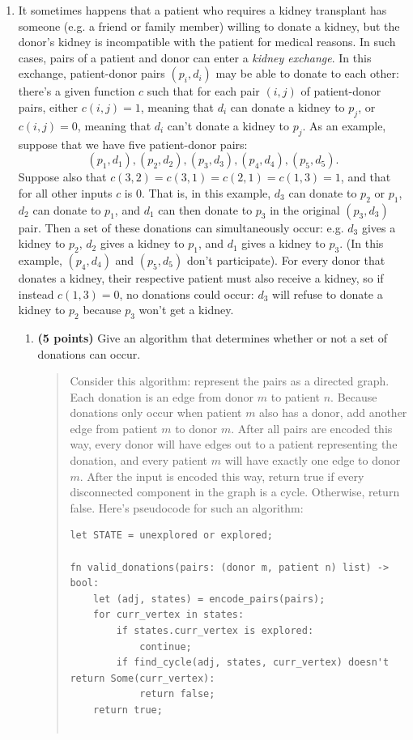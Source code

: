 \documentclass[11pt]{article}
\begin{document}
\begin{enumerate}
\item It sometimes happens that a patient who requires a kidney transplant has someone (e.g. a friend or family member) willing to donate a kidney, but the donor's kidney is incompatible with the patient for medical reasons. In such cases, pairs of a patient and donor can enter a \emph{kidney exchange}. In this exchange, patient-donor pairs $(p_i,d_i)$ may be able to donate to each other: there's a given function $c$ such that for each pair $(i,j)$ of patient-donor pairs, either $c(i,j) = 1$, meaning that $d_i$ can donate a kidney to $p_j$, or $c(i,j) = 0$, meaning that $d_i$ can't donate a kidney to $p_j$. As an example, suppose that we have five patient-donor pairs: $$(p_1,d_1), (p_2,d_2), (p_3,d_3), (p_4,d_4), (p_5,d_5).$$ Suppose also that $c(3,2) = c(3,1) = c(2,1) = c(1,3) = 1$, and that for all other inputs $c$ is 0. That is, in this example, $d_3$ can donate to $p_2$ or $p_1$, $d_2$ can donate to $p_1$, and $d_1$ can then donate to $p_3$ in the original $(p_3,d_3)$ pair. Then a set of these donations can simultaneously occur: e.g. $d_3$ gives a kidney to $p_2$, $d_2$ gives a kidney to $p_1$, and $d_1$ gives a kidney to $p_3$. (In this example, $(p_4,d_4)$ and $(p_5,d_5)$ don't participate). For every donor that donates a kidney, their respective patient must also receive a kidney, so if instead $c(1,3) = 0$, no donations could occur: $d_3$ will refuse to donate a kidney to $p_2$ because $p_3$ won't get a kidney.
\begin{enumerate}
    \item {\bf (5 points)} Give an algorithm that determines whether or not a set of donations can occur. 
      \begin{quote}
        \color{purple}
Consider this algorithm: represent the pairs as a directed graph. Each donation is an edge from donor $m$ to patient $n$. Because donations only occur when patient $m$ also has a donor, add another edge from patient $m$ to donor $m$. After all pairs are encoded this way, every donor will have edges out to a patient representing the donation, and every patient $m$ will have exactly one edge to donor $m$. After the input is encoded this way, return true if every disconnected component in the graph is a cycle. Otherwise, return false. Here's pseudocode for such an algorithm:

  \begin{verbatim}
let STATE = unexplored or explored;

fn valid_donations(pairs: (donor m, patient n) list) -> bool:
    let (adj, states) = encode_pairs(pairs);
    for curr_vertex in states:
        if states.curr_vertex is explored:
            continue;
        if find_cycle(adj, states, curr_vertex) doesn't return Some(curr_vertex): 
            return false;
    return true;


\end{verbatim}
\end{quote}
\end{enumerate}
\end{enumerate}
\end{document}
